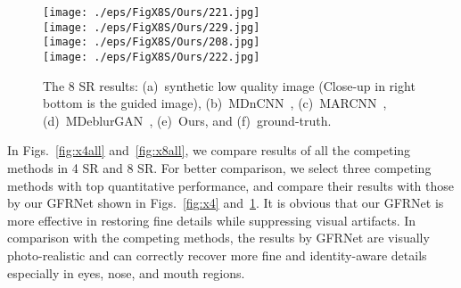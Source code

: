 \documentclass[runningheads]{llncs}
\begin{document}
\begin{figure}[htb]
{  \begin{minipage}[b]{.16\columnwidth}
    \texttt{[image: ./eps/FigX8S/Ours/221.jpg]}\\
    \texttt{[image: ./eps/FigX8S/Ours/229.jpg]}\\
    \texttt{[image: ./eps/FigX8S/Ours/208.jpg]}\\
    \texttt{[image: ./eps/FigX8S/Ours/222.jpg]}
  \end{minipage}
}
\hspace{-3ex}
\vspace{-2ex}
  \caption{The 8 SR results: (a)~synthetic low quality image (Close-up in right bottom is the guided image), (b)~MDnCNN~\cite{zhang2017beyond}, (c)~MARCNN~\cite{Dong2015ICCV}, (d)~MDeblurGAN~\cite{DeblurGAN}, (e)~Ours, and (f)~ground-truth.}
  \label{fig:x8}
\end{figure}
In Figs.~\ref{fig:x4all} and~\ref{fig:x8all}, we compare results of all the competing methods in 4 SR and 8 SR. For better comparison, we select three competing methods with top quantitative performance, and compare their results with those by our GFRNet shown in Figs.~\ref{fig:x4} and~\ref{fig:x8}.
It is obvious that our GFRNet is more effective in restoring fine details while suppressing visual artifacts.
In comparison with the competing methods, the results by GFRNet are visually photo-realistic and can correctly recover more fine and identity-aware details especially in eyes, nose, and mouth regions.
\end{document}
